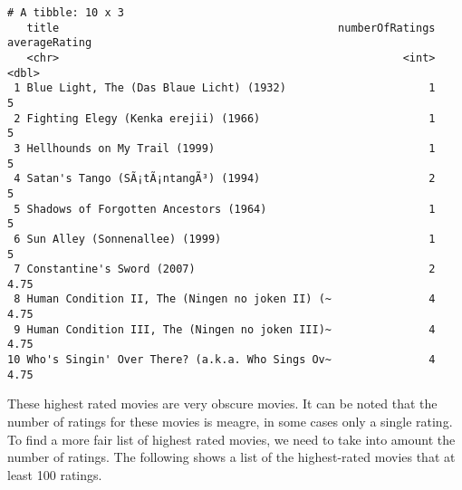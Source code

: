 \documentclass[
]{article}
\newenvironment{Shaded}{\begin{snugshade}}{\end{snugshade}}
\newcommand{\CommentTok}[1]{\textcolor[rgb]{0.00,0.40,1.00}{\textbf{\textit{#1}}}}
\newcommand{\DataTypeTok}[1]{\textcolor[rgb]{0.74,0.68,0.62}{\underline{#1}}}
\newcommand{\DecValTok}[1]{\textcolor[rgb]{0.27,0.67,0.26}{#1}}
\newcommand{\KeywordTok}[1]{\textcolor[rgb]{0.26,0.66,0.93}{\textbf{#1}}}
\newcommand{\NormalTok}[1]{\textcolor[rgb]{0.74,0.68,0.62}{#1}}
\newcommand{\OperatorTok}[1]{\textcolor[rgb]{0.74,0.68,0.62}{#1}}
\newcommand{\StringTok}[1]{\textcolor[rgb]{0.02,0.61,0.04}{#1}}
\begin{document}
\begin{verbatim}
# A tibble: 10 x 3
   title                                           numberOfRatings averageRating
   <chr>                                                     <int>         <dbl>
 1 Blue Light, The (Das Blaue Licht) (1932)                      1          5   
 2 Fighting Elegy (Kenka erejii) (1966)                          1          5   
 3 Hellhounds on My Trail (1999)                                 1          5   
 4 Satan's Tango (SÃ¡tÃ¡ntangÃ³) (1994)                          2          5   
 5 Shadows of Forgotten Ancestors (1964)                         1          5   
 6 Sun Alley (Sonnenallee) (1999)                                1          5   
 7 Constantine's Sword (2007)                                    2          4.75
 8 Human Condition II, The (Ningen no joken II) (~               4          4.75
 9 Human Condition III, The (Ningen no joken III)~               4          4.75
10 Who's Singin' Over There? (a.k.a. Who Sings Ov~               4          4.75
\end{verbatim}

These highest rated movies are very obscure movies. It can be noted that
the number of ratings for these movies is meagre, in some cases only a
single rating. To find a more fair list of highest rated movies, we need
to take into amount the number of ratings. The following shows a list of
the highest-rated movies that at least 100 ratings.

\begin{Shaded}
\end{Shaded}
\end{document}
